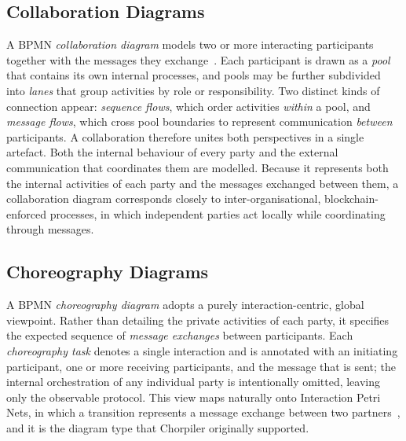 \documentclass[runningheads]{llncs}
\begin{document}
\subsection{Collaboration Diagrams}
A BPMN \emph{collaboration diagram} models two or more interacting participants together with the messages they exchange~\cite{dijkman}. Each participant is drawn as a \emph{pool} that contains its own internal processes, and pools may be further subdivided into \emph{lanes} that group activities by role or responsibility. Two distinct kinds of connection appear: \emph{sequence flows}, which order activities \emph{within} a pool, and \emph{message flows}, which cross pool boundaries to represent communication \emph{between} participants. A collaboration therefore unites both perspectives in a single artefact. Both the internal behaviour of every party and the external communication that coordinates them are modelled. Because it represents both the internal activities of each party and the messages exchanged between them, a collaboration diagram corresponds closely to inter-organisational, blockchain-enforced processes, in which independent parties act locally while coordinating through messages.


\subsection{Choreography Diagrams}
A BPMN \emph{choreography diagram} adopts a purely interaction-centric, global viewpoint. Rather than detailing the private activities of each party, it specifies the expected sequence of \emph{message exchanges} between participants. Each \emph{choreography task} denotes a single interaction and is annotated with an initiating participant, one or more receiving participants, and the message that is sent; the internal orchestration of any individual party is intentionally omitted, leaving only the observable protocol. This view maps naturally onto Interaction Petri Nets, in which a transition represents a message exchange between two partners~\cite{decker}, and it is the diagram type that Chorpiler originally supported.
\end{document}
